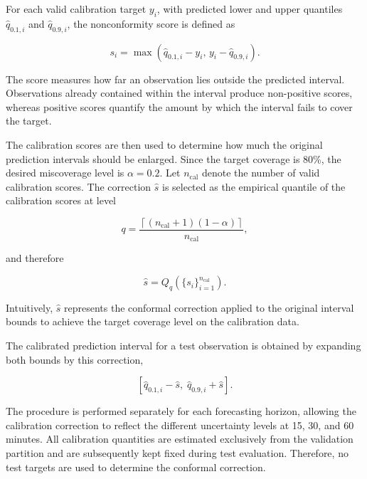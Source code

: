 For each valid calibration target $y_i$, with predicted lower and upper
quantiles $\hat{q}_{0.1,i}$ and $\hat{q}_{0.9,i}$, the nonconformity score is
defined as

\begin{equation}
    s_i =
    \max\left(
        \hat{q}_{0.1,i} - y_i,\,
        y_i - \hat{q}_{0.9,i}
    \right).
    \label{eq:cqr_score}
\end{equation}

The score measures how far an observation lies outside the predicted
interval. Observations already contained within the interval produce
non-positive scores, whereas positive scores quantify the amount by which
the interval fails to cover the target.

The calibration scores are then used to determine how much the original
prediction intervals should be enlarged. Since the target coverage is 80\%,
the desired miscoverage level is $\alpha=0.2$. Let $n_{\mathrm{cal}}$ denote
the number of valid calibration scores. The correction $\hat{s}$ is selected
as the empirical quantile of the calibration scores at level

\begin{equation}
    q =
    \frac{\left\lceil (n_{\mathrm{cal}}+1)(1-\alpha) \right\rceil}
         {n_{\mathrm{cal}}},
    \label{eq:cqr_quantile_level}
\end{equation}

and therefore

\begin{equation}
    \hat{s}
    =
    Q_q\left(\{s_i\}_{i=1}^{n_{\mathrm{cal}}}\right).
    \label{eq:cqr_correction}
\end{equation}

Intuitively, $\hat{s}$ represents the conformal correction applied to the
original interval bounds to achieve the target coverage level on the
calibration data.

The calibrated prediction interval for a test observation is obtained by
expanding both bounds by this correction,

\begin{equation}
    \left[
        \hat{q}_{0.1,i} - \hat{s},
        \;
        \hat{q}_{0.9,i} + \hat{s}
    \right].
    \label{eq:cqr_interval}
\end{equation}

The procedure is performed separately for each forecasting horizon, allowing
the calibration correction to reflect the different uncertainty levels at
15, 30, and 60 minutes. All calibration quantities are estimated exclusively
from the validation partition and are subsequently kept fixed during test
evaluation. Therefore, no test targets are used to determine the conformal
correction.

